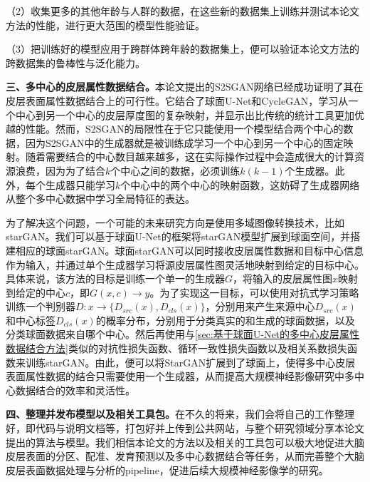 （2）收集更多的其他年龄与人群的数据，在这些新的数据集上训练并测试本论文方法的性能，进行更大范围的模型性能验证。

（3）把训练好的模型应用于跨群体跨年龄的数据集上，便可以验证本论文方法的跨数据集的鲁棒性与泛化能力。

\textbf{三、多中心的皮层属性数据结合。}本论文提出的S2SGAN网络已经成功证明了其在皮层表面属性数据结合上的可行性。它结合了球面U-Net和CycleGAN，学习从一个中心到另一个中心的皮层厚度图的复杂映射，并显示出比传统的统计工具更加优越的性能。然而，S2SGAN的局限性在于它只能使用一个模型结合两个中心的数据，因为S2SGAN中的生成器就是被训练成学习一个中心到另一个中心的固定映射。随着需要结合的中心数目越来越多，这在实际操作过程中会造成很大的计算资源浪费，因为为了结合$k$个中心之间的数据，必须训练$k(k-1)$个生成器。此外，每个生成器只能学习$k$个中心中的两个中心的映射函数，这妨碍了生成器网络从整个多中心数据中学习全局特征的表达。

为了解决这个问题，一个可能的未来研究方向是使用多域图像转换技术，比如starGAN\cite{choi2018stargan}。我们可以基于球面U-Net的框架将starGAN模型扩展到球面空间，并搭建相应的球面starGAN。球面starGAN可以同时接收皮层属性数据和目标中心信息作为输入，并通过单个生成器学习将源皮层属性图灵活地映射到给定的目标中心。具体来说，该方法的目标是训练一个单一的生成器$G$，将输入的皮层属性图$x$映射到给定的中心$c$，即$G(x,c)\rightarrow y$。为了实现这一目标，可以使用对抗式学习策略\cite{goodfellow2014generative}训练一个判别器$D:x\rightarrow \{D_{src}(x),D_{cls}(x)\}$，分别用来产生来源中心$D_{src}(x)$和中心标签$D_{cls}(x)$的概率分布，分别用于分类真实的和生成的球面数据，以及分类球面数据来自哪个中心。然后再使用与\ref{sec:基于球面U-Net的多中心皮层属性数据结合方法}类似的对抗性损失函数、循环一致性损失函数以及相关系数损失函数来训练starGAN。由此，便可以将StarGAN扩展到了球面上，使得多中心皮层表面属性数据的结合只需要使用一个生成器，从而提高大规模神经影像研究中多中心数据结合的效率和灵活性。

\textbf{四、整理并发布模型以及相关工具包。}在不久的将来，我们会将自己的工作整理好，即代码与说明文档等，打包好并上传到公共网站，与整个研究领域分享本论文提出的算法与模型。我们相信本论文的方法以及相关的工具包可以极大地促进大脑皮层表面的分区、配准、发育预测以及多中心数据结合等任务，从而完善整个大脑皮层表面数据处理与分析的pipeline，促进后续大规模神经影像学的研究。